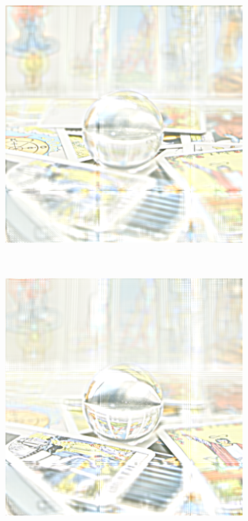 \documentclass[11pt,a4paper,titlepage]{article}
\begin{document}
\begin{figure}
\begin{subfigure}[t]{0.19\textwidth}
	\end{subfigure}%
	~
	\begin{subfigure}[t]{0.19\textwidth}
		\includegraphics[width=\textwidth]{results/tile_blending/tarot6x6x512x512-512x512x5-sampling=2x_tileRes=200x200_overlap=0/3.png} 
	\end{subfigure}%
	~
	\begin{subfigure}[t]{0.19\textwidth}
		\includegraphics[width=\textwidth]{results/tile_blending/tarot6x6x512x512-512x512x5-sampling=2x_tileRes=200x200_overlap=0/4.png}

\end{subfigure}
\end{figure}
\end{document}
